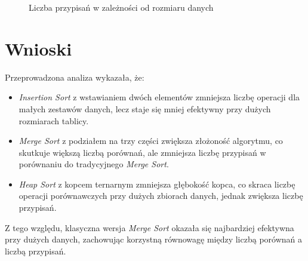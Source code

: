\documentclass[a4paper,12pt]{article}
\begin{document}
\begin{figure}[H]
    \centering
    \caption{Liczba przypisań w zależności od rozmiaru danych}
\end{figure}

\section{Wnioski}
Przeprowadzona analiza wykazała, że:
\begin{itemize}
    \item \textit{Insertion Sort} z wstawianiem dwóch elementów zmniejsza liczbę operacji dla małych zestawów danych, lecz staje się mniej efektywny przy dużych rozmiarach tablicy.
    \item \textit{Merge Sort} z podziałem na trzy części zwiększa złożoność algorytmu, co skutkuje większą liczbą porównań, ale zmniejsza liczbę przypisań w porównaniu do tradycyjnego \textit{Merge Sort}.
    \item \textit{Heap Sort} z kopcem ternarnym zmniejsza głębokość kopca, co skraca liczbę operacji porównawczych przy dużych zbiorach danych, jednak zwiększa liczbę przypisań.
\end{itemize}

Z tego względu, klasyczna wersja \textit{Merge Sort} okazała się najbardziej efektywna przy dużych danych, zachowując korzystną równowagę między liczbą porównań a liczbą przypisań.
\end{document}

